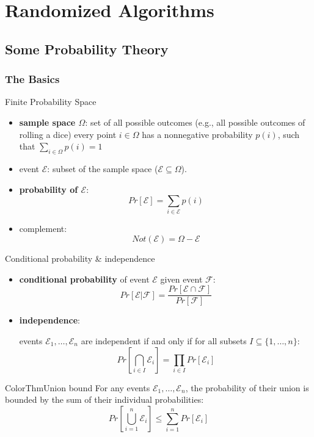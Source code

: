 \documentclass[a4paper, 11pt]{report}
\begin{document}
\chapter{Randomized Algorithms}

\section{Some Probability Theory}
\subsection{The Basics}
\begin{defframe}{Finite Probability Space}{}
    \begin{itemize}
        \item \textbf{sample space $\Omega$}: set of all possible outcomes (e.g., all possible outcomes of rolling a dice)
            \subitem every point $i \in \Omega$ has a nonnegative probability $p(i)$, such that $\sum_{i \in \Omega} p(i) = 1$
        \item event $\mathcal{E}$: subset of the sample space ($\mathcal{E} \subseteq \Omega$).
        \item \textbf{probability of $\mathcal{E}$}: 
            $$Pr[\mathcal{E}] = \sum_{i \in \mathcal{E}} p(i)$$
        \item complement: 
            $$Not(\mathcal{E}) = \Omega - \mathcal{E}$$
    \end{itemize}
\end{defframe}

\begin{defframe}{Conditional probability \& independence}{}
    \begin{itemize}
        \item \textbf{conditional probability} of event $\mathcal{E}$ given event $\mathcal{F}$:
        $$Pr[\mathcal{E} | \mathcal{F}] = \frac{Pr[\mathcal{E} \cap \mathcal{F}]}{Pr[\mathcal{F}]}$$
        \item \textbf{independence}: 

            events $\mathcal{E}_1, \dots, \mathcal{E}_n$ are independent if and only if for all subsets $I \subseteq \{1, \dots, n\}$:
        $$Pr\left[\bigcap_{i \in I} \mathcal{E}_i\right] = \prod_{i \in I} Pr[\mathcal{E}_i]$$
    \end{itemize}
\end{defframe}

\begin{cframe}{ColorThm}{Union bound}{}
    For any events $\mathcal{E}_1, \dots, \mathcal{E}_n$, the probability of their union is bounded by the sum of their individual probabilities:
    $$Pr\left[\bigcup_{i=1}^n \mathcal{E}_i\right] \le \sum_{i=1}^n Pr[\mathcal{E}_i]$$
\end{cframe}
\end{document}
